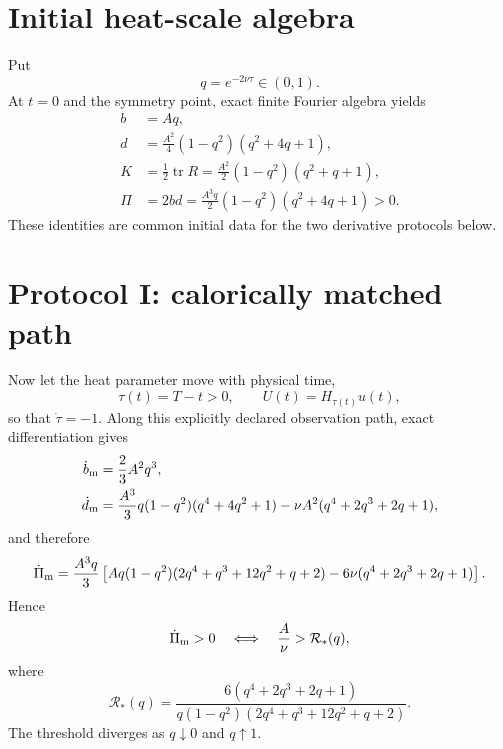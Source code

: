 \documentclass[11pt,a4paper]{article}
\newcommand{\tr}{\operatorname{tr}}
\begin{document}
\section{Initial heat-scale algebra}
Put
\begin{equation}
 q=e^{-2\nu\tau}\in(0,1).
\end{equation}
At $t=0$ and the symmetry point, exact finite Fourier algebra yields
\begin{align}
 b&=Aq,\\
 d&=\frac{A^2}{4}(1-q^2)(q^2+4q+1),\\
 K&=\frac12\tr R=\frac{A^2}{2}(1-q^2)(q^2+q+1),\\
 \Pi&=2bd=\frac{A^3q}{2}(1-q^2)(q^2+4q+1)>0.
 \label{eq:basicq}
\end{align}
These identities are common initial data for the two derivative protocols below.

\section{Protocol I: calorically matched path}
Now let the heat parameter move with physical time,
\begin{equation}
 \tau(t)=T-t>0,
 \qquad U(t)=H_{\tau(t)}u(t),
\end{equation}
so that $\dot\tau=-1$. Along this explicitly declared observation path, exact differentiation gives
\begin{align}
 \dot b_{\rm m}&=\frac23 A^2q^3,\\
 \dot d_{\rm m}&=\frac{A^3}{3}q(1-q^2)(q^4+4q^2+1)
 -\nu A^2(q^4+2q^3+2q+1),
\end{align}
and therefore
\begin{equation}
 \dot\Pi_{\rm m}=\frac{A^3q}{3}\left[
 Aq(1-q^2)(2q^4+q^3+12q^2+q+2)
 -6\nu(q^4+2q^3+2q+1)
 \right].
 \label{eq:PidotMatched}
\end{equation}
Hence
\begin{equation}
 \dot\Pi_{\rm m}>0
 \quad\Longleftrightarrow\quad
 \frac{A}{\nu}>\mathcal R_*(q),
\end{equation}
where
\begin{equation}
 \boxed{\displaystyle
 \mathcal R_*(q)=
 \frac{6(q^4+2q^3+2q+1)}{q(1-q^2)(2q^4+q^3+12q^2+q+2)}.}
 \label{eq:Rstar}
\end{equation}
The threshold diverges as $q\downarrow0$ and $q\uparrow1$.
\end{document}
